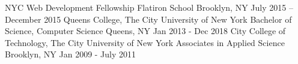 \begin{cventries}
  \cventry
    {NYC Web Development Fellowship}
    {Flatiron School}
    {Brooklyn, NY}
    {July 2015 – December 2015}
    {}
  \cventry
    {Queens College, The City University of New York}
    {Bachelor of Science, Computer Science}
    {Queens, NY}
    {Jan 2013 - Dec 2018}    
    {}
    \cventry
    {City College of Technology, The City University of New York}
    {Associates in Applied Science}
    {Brooklyn, NY}
    {Jan 2009 - July 2011}
    {}
\end{cventries}

